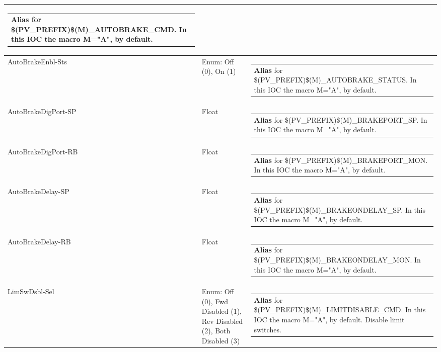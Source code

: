 \documentclass[openany]{article}
\begin{document}
\begin{longtable}{| m{4.5cm} m{2.5cm}  m{8.5cm} |}
\begin{tabular}{@{}m{6cm}@{}}
                \textbf{\color{blue} Alias} for \$(PV\_PREFIX)\$(M)\_AUTOBRAKE\_CMD. In this IOC the macro M="A", by default.
            \end{tabular} \hypertarget{}{}\\ \hline
        AutoBrakeEnbl-Sts & Enum: Off (0), On (1) & \begin{tabular}{@{}m{6cm}@{}}
                \textbf{\color{blue} Alias} for \$(PV\_PREFIX)\$(M)\_AUTOBRAKE\_STATUS. In this IOC the macro M="A", by default.
            \end{tabular} \hypertarget{pv:auto-brake-dig-port}{}\\ \hline
        AutoBrakeDigPort-SP & Float & \begin{tabular}{@{}m{6cm}@{}}
                \textbf{\color{blue} Alias} for \$(PV\_PREFIX)\$(M)\_BRAKEPORT\_SP. In this IOC the macro M="A", by default.
            \end{tabular} \hypertarget{}{}\\ \hline
        AutoBrakeDigPort-RB & Float & \begin{tabular}{@{}m{6cm}@{}}
                \textbf{\color{blue} Alias} for \$(PV\_PREFIX)\$(M)\_BRAKEPORT\_MON. In this IOC the macro M="A", by default.
            \end{tabular} \hypertarget{pv:auto-brake-delay}{}\\ \hline
        AutoBrakeDelay-SP & Float & \begin{tabular}{@{}m{6cm}@{}}
                \textbf{\color{blue} Alias} for \$(PV\_PREFIX)\$(M)\_BRAKEONDELAY\_SP. In this IOC the macro M="A", by default.
            \end{tabular} \hypertarget{}{}\\ \hline
        AutoBrakeDelay-RB & Float & \begin{tabular}{@{}m{6cm}@{}}
                \textbf{\color{blue} Alias} for \$(PV\_PREFIX)\$(M)\_BRAKEONDELAY\_MON. In this IOC the macro M="A", by default.
            \end{tabular} \hypertarget{pv:lim-sw-dsbl}{}\\ \hline
        LimSwDsbl-Sel & Enum: Off (0), Fwd Disabled (1), Rev Disabled (2), Both Disabled (3) & \begin{tabular}{@{}m{6cm}@{}}
                \textbf{\color{blue} Alias} for \$(PV\_PREFIX)\$(M)\_LIMITDISABLE\_CMD. In this IOC the macro M="A", by default. Disable limit switches.

\end{tabular}
\end{longtable}
\end{document}
